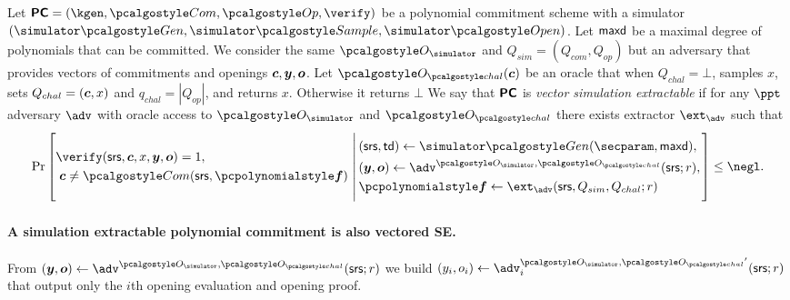 \documentclass[runningheads,11pt]{llncs}
\let\spvec\vec
\let\vec\accentvec
\let\spvec\vec
\let\vec\spvec
\def\vec#1{\mathchoice{\mbox{\boldmath$\displaystyle#1$}}
  {\mbox{\boldmath$\textstyle#1$}} {\mbox{\boldmath$\scriptstyle#1$}}
  {\mbox{\boldmath$\scriptscriptstyle#1$}}}
\begin{document}
\begin{definition}
  \label{def:sepcom}
  Let $\PCOM = (\kgen, \com, \open, \verify)$ be a polynomial commitment
  scheme with a simulator $(\simgen, \simsample, \simopen)$. Let $\mathsf{maxd}$ be a maximal degree of polynomials that can be
  committed.
  We consider the same $\oracles$ and $Q_{sim}= (Q_{com},Q_{op})$ but an adversary that provides vectors of commitments and openings $\vec{c}, \vec{y}, \vec{o}$.
   Let $\oraclec(\vec{c})$ be an oracle that when $Q_{chal}= \bot$, samples $x$, sets $Q_{chal}=(\vec{c},x)$ and $q_{{chal}}= |Q_{{op}}|$, and returns $x$. Otherwise it returns $\bot$
  We say that $\bm{\mathsf{PC}}$ is \emph{vector simulation extractable} if for any $\ppt$
  adversary $\adv$ with oracle access to $\oracles$ and $\oraclec$ there exists extractor
  $\ext_{\adv}$ such that
\[
  \Pr \left[
    \begin{aligned}
      & \verify(\srs, \vec{c}, x, \vec{y}, \vec{o}) = 1, \\
      & \;\vec{c} \neq \com(\srs, \vec{\p{f}})\\
    \end{aligned}
    \,\left|\,
      \vphantom{
        \begin{aligned}
          & \\
          & \\
          & \\
          &
        \end{aligned}
        }
    \begin{aligned}
      & (\srs, \td) \gets \simgen(\secparam, \maxdeg),\\
      & (\vec{y}, \vec{o}) \gets \adv^{\oracles,\oraclec}(\srs; r), \\
      & \vec{\p{f}} \gets \ext_\adv(\srs, Q_{sim}, Q_{chal}; r)
    \end{aligned}
  \right.\right]
  \leq \negl.
\]
\end{definition}

\paragraph{A simulation extractable polynomial commitment is also vectored SE.}
From $(\vec{y}, \vec{o}) \gets \adv^{\oracles,\oraclec}(\srs; r)$ we build $(y_{i}, o_{i}) \gets \adv_{i}^{\oracles,\oraclec'}(\srs; r)$ that output only the $i$th opening evaluation and opening proof.
\end{document}
